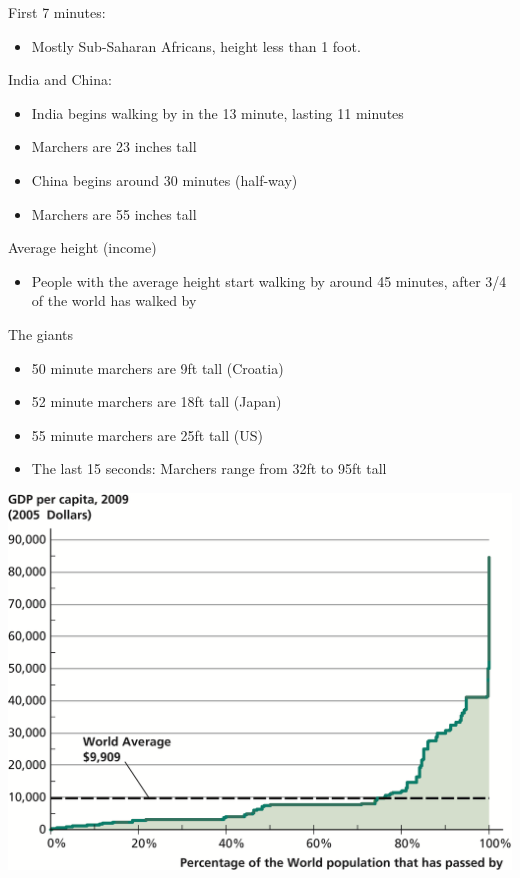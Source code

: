 \documentclass[10pt]{beamer}
\begin{document}
\begin{frame}[label={sec:org97c826c}]{}
\alert{First 7 minutes:}
\begin{itemize}
\item Mostly Sub-Saharan Africans, height less than 1 foot.
\end{itemize}
\end{frame}

\begin{frame}[label={sec:orgc450555}]{}
\alert{India and China:}
\begin{itemize}
\item India begins walking by in the 13 minute, lasting 11 minutes
\item Marchers are 23 inches tall
\item China begins around 30 minutes (half-way)
\item Marchers are 55 inches tall
\end{itemize}
\end{frame}

\begin{frame}[label={sec:orgf8268b0}]{}
\alert{Average height (income)}
\begin{itemize}
\item People with the average height start walking by around 45 minutes, after 3/4 of the world has walked by
\end{itemize}
\end{frame}

\begin{frame}[label={sec:orgaff39bc}]{}
\alert{The giants}
\begin{itemize}
\item 50 minute marchers are 9ft tall (Croatia)
\item 52 minute marchers are 18ft tall (Japan)
\item 55 minute marchers are 25ft tall (US)
\item The last 15 seconds: Marchers range from 32ft to 95ft tall
\end{itemize}
\end{frame}

\begin{frame}[label={sec:org5036c4a}]{}
\begin{center}
\includegraphics[width=.75\textwidth]{./img/1.1.png}
\end{center}
\end{frame}
\end{document}
